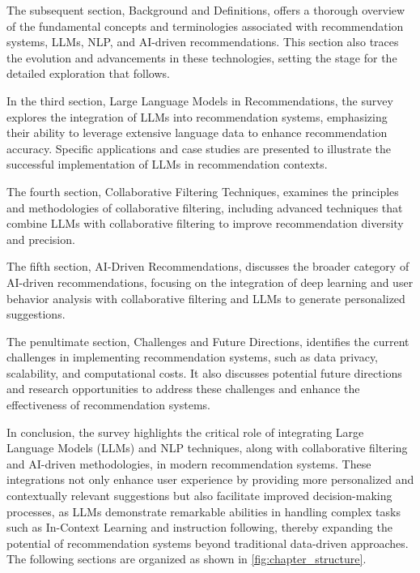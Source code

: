 The subsequent section, Background and Definitions, offers a thorough overview of the fundamental concepts and terminologies associated with recommendation systems, LLMs, NLP, and AI-driven recommendations. This section also traces the evolution and advancements in these technologies, setting the stage for the detailed exploration that follows.



In the third section, Large Language Models in Recommendations, the survey explores the integration of LLMs into recommendation systems, emphasizing their ability to leverage extensive language data to enhance recommendation accuracy. Specific applications and case studies are presented to illustrate the successful implementation of LLMs in recommendation contexts.



The fourth section, Collaborative Filtering Techniques, examines the principles and methodologies of collaborative filtering, including advanced techniques that combine LLMs with collaborative filtering to improve recommendation diversity and precision.



The fifth section, AI-Driven Recommendations, discusses the broader category of AI-driven recommendations, focusing on the integration of deep learning and user behavior analysis with collaborative filtering and LLMs to generate personalized suggestions.



The penultimate section, Challenges and Future Directions, identifies the current challenges in implementing recommendation systems, such as data privacy, scalability, and computational costs. It also discusses potential future directions and research opportunities to address these challenges and enhance the effectiveness of recommendation systems.



In conclusion, the survey highlights the critical role of integrating Large Language Models (LLMs) and NLP techniques, along with collaborative filtering and AI-driven methodologies, in modern recommendation systems. These integrations not only enhance user experience by providing more personalized and contextually relevant suggestions but also facilitate improved decision-making processes, as LLMs demonstrate remarkable abilities in handling complex tasks such as In-Context Learning and instruction following, thereby expanding the potential of recommendation systems beyond traditional data-driven approaches. \cite{ren2024representation,xu2024prompting}The following sections are organized as shown in \autoref{fig:chapter_structure}.







